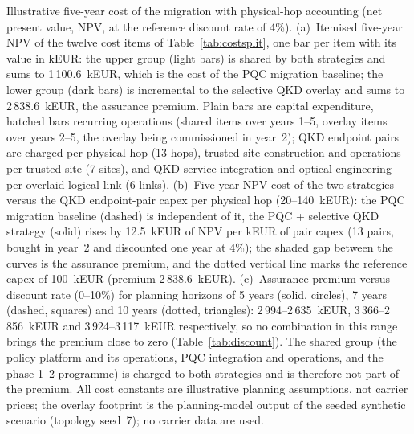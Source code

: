Illustrative five-year cost of the migration with physical-hop accounting
(net present value, NPV, at the reference discount rate of 4\%).
(a)~Itemised five-year NPV of the twelve cost items of
Table~\ref{tab:costsplit}, one bar per item with its value in kEUR: the
upper group (light bars) is shared by both strategies and sums to
1\,100.6~kEUR, which is the cost of the PQC migration baseline; the lower
group (dark bars) is incremental to the selective QKD overlay and sums to
2\,838.6~kEUR, the assurance premium. Plain bars are capital expenditure,
hatched bars recurring operations (shared items over years 1--5, overlay
items over years 2--5, the overlay being commissioned in year~2); QKD endpoint pairs are
charged per physical hop (13 hops), trusted-site construction and operations
per trusted site (7 sites), and QKD service integration and optical
engineering per overlaid logical link (6 links).
(b)~Five-year NPV cost of the two strategies versus the QKD endpoint-pair
capex per physical hop (20--140~kEUR): the PQC migration baseline (dashed) is
independent of it, the PQC + selective QKD strategy (solid) rises by 12.5~kEUR
of NPV per kEUR of pair capex (13 pairs, bought in year~2 and discounted
one year at 4\%); the shaded
gap between the curves is the assurance premium, and the dotted vertical line
marks the reference capex of 100~kEUR (premium 2\,838.6~kEUR).
(c)~Assurance premium versus discount rate (0--10\%) for planning horizons
of 5 years (solid, circles), 7 years (dashed, squares) and 10 years (dotted,
triangles): 2\,994--2\,635~kEUR, 3\,366--2\,856~kEUR and 3\,924--3\,117~kEUR
respectively, so no combination in this range brings the premium close to
zero (Table~\ref{tab:discount}). The shared group (the policy
platform and its operations, PQC integration and operations, and the
phase 1--2 programme) is charged to both strategies and is therefore not
part of the premium. All
cost constants are illustrative planning assumptions, not carrier prices;
the overlay footprint is the planning-model output of the seeded synthetic
scenario (topology seed~7); no carrier data are used.
